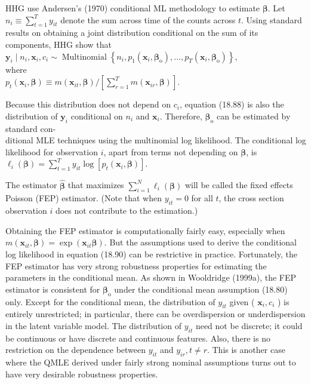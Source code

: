 \documentclass[10pt]{article}
\begin{document}
HHG use Andersen's (1970) conditional ML methodology to estimate $\boldsymbol{\beta}$. Let $n_{i} \equiv \sum_{t=1}^{T} y_{i t}$ denote the sum across time of the counts across $t$. Using standard results on obtaining a joint distribution conditional on the sum of its components, HHG show that\\
$\mathbf{y}_{i} \mid n_{i}, \mathbf{x}_{i}, c_{i} \sim \operatorname{Multinomial}\left\{n_{i}, p_{1}\left(\mathbf{x}_{i}, \boldsymbol{\beta}_{\mathrm{o}}\right), \ldots, p_{T}\left(\mathbf{x}_{i}, \boldsymbol{\beta}_{\mathrm{o}}\right)\right\}$,\\
where\\
$p_{t}\left(\mathbf{x}_{i}, \boldsymbol{\beta}\right) \equiv m\left(\mathbf{x}_{i t}, \boldsymbol{\beta}\right) /\left[\sum_{r=1}^{T} m\left(\mathbf{x}_{i r}, \boldsymbol{\beta}\right)\right]$.

Because this distribution does not depend on $c_{i}$, equation (18.88) is also the distribution of $\mathbf{y}_{i}$ conditional on $n_{i}$ and $\mathbf{x}_{i}$. Therefore, $\boldsymbol{\beta}_{\mathrm{o}}$ can be estimated by standard con-\\
ditional MLE techniques using the multinomial log likelihood. The conditional log likelihood for observation $i$, apart from terms not depending on $\boldsymbol{\beta}$, is\\
$\ell_{i}(\boldsymbol{\beta})=\sum_{t=1}^{T} y_{i t} \log \left[p_{t}\left(\mathbf{x}_{i}, \boldsymbol{\beta}\right)\right]$.

The estimator $\hat{\boldsymbol{\beta}}$ that maximizes $\sum_{i=1}^{N} \ell_{i}(\boldsymbol{\beta})$ will be called the fixed effects Poisson (FEP) estimator. (Note that when $y_{i t}=0$ for all $t$, the cross section observation $i$ does not contribute to the estimation.)

Obtaining the FEP estimator is computationally fairly easy, especially when $m\left(\mathbf{x}_{i t}, \boldsymbol{\beta}\right)=\exp \left(\mathbf{x}_{i t} \boldsymbol{\beta}\right)$. But the assumptions used to derive the conditional log likelihood in equation (18.90) can be restrictive in practice. Fortunately, the FEP estimator has very strong robustness properties for estimating the parameters in the conditional mean. As shown in Wooldridge (1999a), the FEP estimator is consistent for $\boldsymbol{\beta}_{\mathrm{o}}$ under the conditional mean assumption (18.80) only. Except for the conditional mean, the distribution of $y_{i t}$ given ( $\mathbf{x}_{i}, c_{i}$ ) is entirely unrestricted; in particular, there can be overdispersion or underdispersion in the latent variable model. The distribution of $y_{i t}$ need not be discrete; it could be continuous or have discrete and continuous features. Also, there is no restriction on the dependence between $y_{i t}$ and $y_{i r}, t \neq r$. This is another case where the QMLE derived under fairly strong nominal assumptions turns out to have very desirable robustness properties.
\end{document}
